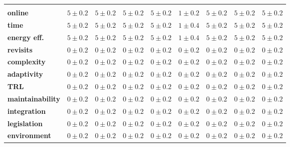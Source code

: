 {
\noindent
{}
\begin{longtabu}{X[3,r,m] X[2,c,m] X[2,c,m] X[2,c,m] X[2,c,m] X[2,c,m] X[2,c,m] X[2,c,m] X[2,c,m]}
 \rowfont{\sffamily\bfseries\color{RoyalWhite}}
  \color{RoyalWhite} & \color{RoyalWhite}  & \color{RoyalWhite}  & \color{RoyalWhite}  & \color{RoyalWhite}  & \color{RoyalWhite}  & \color{RoyalWhite}  & \color{RoyalWhite}  & \color{RoyalWhite} \\
  \textbf{online} & \(5 \pm 0.2\) & \(5 \pm 0.2\) & \(5 \pm 0.2\) & \(5 \pm 0.2\) & \(1 \pm 0.2\) & \(5 \pm 0.2\) & \(5 \pm 0.2\) & \(5 \pm 0.2\)\\
  \textbf{time} & \(5 \pm 0.2\) & \(5 \pm 0.2\) & \(5 \pm 0.2\) & \(5 \pm 0.2\) & \(1 \pm 0.4\) & \(5 \pm 0.2\) & \(5 \pm 0.2\) & \(5 \pm 0.2\)\\
  \textbf{energy eff.} & \(5 \pm 0.2\) & \(5 \pm 0.2\) & \(5 \pm 0.2\) & \(5 \pm 0.2\) & \(1 \pm 0.4\) & \(5 \pm 0.2\) & \(5 \pm 0.2\) & \(5 \pm 0.2\)\\
  \textbf{revisits} & \(0 \pm 0.2\) & \(0 \pm 0.2\) & \(0 \pm 0.2\) & \(0 \pm 0.2\) & \(0 \pm 0.2\) & \(0 \pm 0.2\) & \(0 \pm 0.2\) & \(0 \pm 0.2\)\\
  \textbf{complexity} & \(0 \pm 0.2\) & \(0 \pm 0.2\) & \(0 \pm 0.2\) & \(0 \pm 0.2\) & \(0 \pm 0.2\) & \(0 \pm 0.2\) & \(0 \pm 0.2\) & \(0 \pm 0.2\)\\
  \textbf{adaptivity} & \(0 \pm 0.2\) & \(0 \pm 0.2\) & \(0 \pm 0.2\) & \(0 \pm 0.2\) & \(0 \pm 0.2\) & \(0 \pm 0.2\) & \(0 \pm 0.2\) & \(0 \pm 0.2\)\\
  \textbf{TRL} & \(0 \pm 0.2\) & \(0 \pm 0.2\) & \(0 \pm 0.2\) & \(0 \pm 0.2\) & \(0 \pm 0.2\) & \(0 \pm 0.2\) & \(0 \pm 0.2\) & \(0 \pm 0.2\)\\
  \textbf{maintainability} & \(0 \pm 0.2\) & \(0 \pm 0.2\) & \(0 \pm 0.2\) & \(0 \pm 0.2\) & \(0 \pm 0.2\) & \(0 \pm 0.2\) & \(0 \pm 0.2\) & \(0 \pm 0.2\)\\
  \textbf{integration} & \(0 \pm 0.2\) & \(0 \pm 0.2\) & \(0 \pm 0.2\) & \(0 \pm 0.2\) & \(0 \pm 0.2\) & \(0 \pm 0.2\) & \(0 \pm 0.2\) & \(0 \pm 0.2\)\\
  \textbf{legislation} & \(0 \pm 0.2\) & \(0 \pm 0.2\) & \(0 \pm 0.2\) & \(0 \pm 0.2\) & \(0 \pm 0.2\) & \(0 \pm 0.2\) & \(0 \pm 0.2\) & \(0 \pm 0.2\)\\
  \textbf{environment} & \(0 \pm 0.2\) & \(0 \pm 0.2\) & \(0 \pm 0.2\) & \(0 \pm 0.2\) & \(0 \pm 0.2\) & \(0 \pm 0.2\) & \(0 \pm 0.2\) & \(0 \pm 0.2\)\\
\end{longtabu}
}
